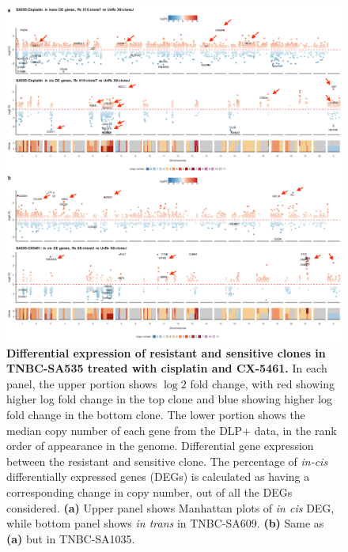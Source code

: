 \begin{figure}
\centering
  \includegraphics[width=\textwidth]{Figures/chap5/trackplotsSA535.png}
\caption[DE of resistant and sensitive clonealign defined clones]
	{\small
	\textbf{Differential expression of resistant and sensitive clones in TNBC-SA535 treated with cisplatin and CX-5461.}
 In each panel, the upper portion shows $\log 2$ fold change, with red showing higher log fold change in the top clone and blue showing higher log fold change in the bottom clone. The lower portion shows the median copy number of each gene from the DLP+ data, in the rank order of appearance in the genome.  Differential gene expression between the resistant and sensitive clone. The percentage of \textit{in-cis} differentially expressed genes (DEGs) is calculated as having a corresponding change in copy number, out of all the DEGs considered. 
 \textbf{(a)} Upper panel shows Manhattan plots of \textit{in cis} DEG, while bottom panel shows \textit{in trans} in TNBC-SA609.
 \textbf{(b)} Same as  \textbf{(a)} but in TNBC-SA1035.
}
	\label{fig:trackplotsSA535}
 \end{figure}







